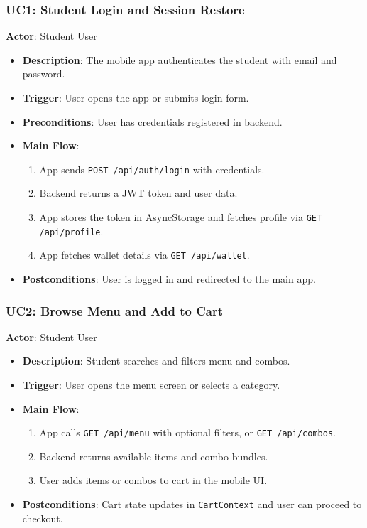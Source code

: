 \subsubsection{UC1: Student Login and Session Restore}
\textbf{Actor}: Student User
\begin{itemize}[nosep]
  \item \textbf{Description}: The mobile app authenticates the student with email and password.
  \item \textbf{Trigger}: User opens the app or submits login form.
  \item \textbf{Preconditions}: User has credentials registered in backend.
  \item \textbf{Main Flow}:
    \begin{enumerate}[nosep]
      \item App sends \texttt{POST /api/auth/login} with credentials.
      \item Backend returns a JWT token and user data.
      \item App stores the token in AsyncStorage and fetches profile via \texttt{GET /api/profile}.
      \item App fetches wallet details via \texttt{GET /api/wallet}.
    \end{enumerate}
  \item \textbf{Postconditions}: User is logged in and redirected to the main app.
\end{itemize}

\subsubsection{UC2: Browse Menu and Add to Cart}
\textbf{Actor}: Student User
\begin{itemize}[nosep]
  \item \textbf{Description}: Student searches and filters menu and combos.
  \item \textbf{Trigger}: User opens the menu screen or selects a category.
  \item \textbf{Main Flow}:
    \begin{enumerate}[nosep]
      \item App calls \texttt{GET /api/menu} with optional filters, or \texttt{GET /api/combos}.
      \item Backend returns available items and combo bundles.
      \item User adds items or combos to cart in the mobile UI.
    \end{enumerate}
  \item \textbf{Postconditions}: Cart state updates in \texttt{CartContext} and user can proceed to checkout.
\end{itemize}

